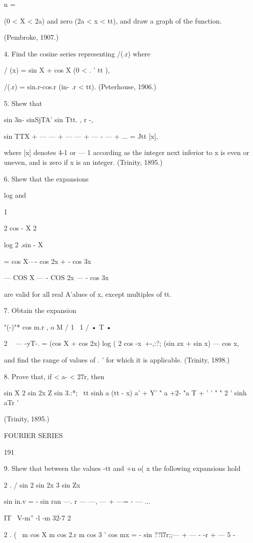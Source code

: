 {n = \

(0 < X < 2a) and zero (2a < x < tt), and draw a graph of the function.

(Pembroke, 1907.)

4. Find the cosine series representing /(.r) where

/ (x) = sin X + cos X (0 < . ' tt ),

/(.r) = sin.r-cos.r (in- .r < tt). (Peterhouse, 1906.)

5. Shew that

sin 3n- sinSjTA' sin Ttt. , r -,

sin TTX + — — + — — + — - — + ... = Jtt [x],

where [x] denotes 4-1 or — 1 according as the integer next inferior to
x is even or uneven, and is zero if x is an integer. (Trinity, 1895.)

6. Shew that the expansions

log and

1

2 cos - X 2

log 2 .sin - X

= cos X—- cos 2x + - cos 3x

— COS X — - COS 2x — - cos 3x

are valid for all real A'alues of x, except multiples of tt.

7. Obtain the expansion

"(-)"* cos m.r , o M / 1 \ 1 / • T • \

2 ~ — -yT-. = (cos X + cos 2x) log ( 2 cos -x\ +-,:?; (sin zx + sin x)
— cos x,

and find the range of values of . ' for which it is applicable.
(Trinity, 1898.)

8. Prove that, if < a- < 27r, then

sin X 2 sin 2x Z sin 3.:*; \ tt sinh a (tt - x) a' + Y' " a +2- "a T +
' ' " " 2 ' sinh aTr '

(Trinity, 1895.)

FOURIER SERIES

191

9. Shew that between the values -tt and +n o( x the following
expansions hold

2 . / sin 2 sin 2x 3 sin Zx

sin in.v = - sin ran —. r — —, — + —= - — ...

IT \ V-m'' -l -m 32-7 2

2 . ( \ m cos X m cos 2.r m cos 3 ' cos mx = - sin ??l7r;;— + — - -r
+ — 5 -

}
